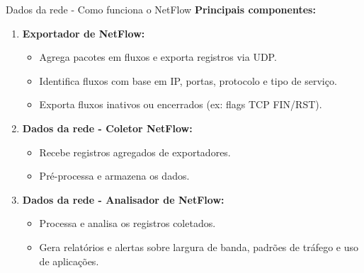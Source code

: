 \begin{frame}{Dados da rede - Como funciona o NetFlow}
\textbf{Principais componentes:}
\begin{enumerate}
    \item \textbf{Exportador de NetFlow:}
    \begin{itemize}
        \item Agrega pacotes em fluxos e exporta registros via UDP.
        \item Identifica fluxos com base em IP, portas, protocolo e tipo de serviço.
        \item Exporta fluxos inativos ou encerrados (ex: flags TCP FIN/RST).
    \end{itemize}
    
    \item \textbf{Dados da rede - Coletor NetFlow:}
    \begin{itemize}
        \item Recebe registros agregados de exportadores.
        \item Pré-processa e armazena os dados.
    \end{itemize}
    
    \item \textbf{Dados da rede - Analisador de NetFlow:}
    \begin{itemize}
        \item Processa e analisa os registros coletados.
        \item Gera relatórios e alertas sobre largura de banda, padrões de tráfego e uso de aplicações.
    \end{itemize}
\end{enumerate}
\end{frame}


